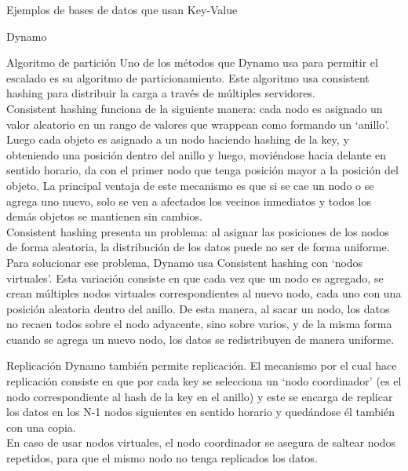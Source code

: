 \begin{section}{Ejemplos de bases de datos que usan Key-Value}
\begin{subsection}{Dynamo}
\begin{subsubsection}{Algoritmo de partición}
Uno de los métodos que Dynamo usa para permitir el escalado es su algoritmo de particionamiento. Este algoritmo usa consistent hashing para distribuir la carga a través de múltiples servidores. \\

	Consistent hashing funciona de la siguiente manera: cada nodo es asignado un valor aleatorio en un rango de valores que wrappean como formando un ‘anillo’. Luego cada objeto es asignado a un nodo haciendo hashing de la key, y obteniendo una posición dentro del anillo y luego, moviéndose hacia delante en sentido horario, da con el primer nodo que tenga posición mayor a la posición del objeto. La principal ventaja de este mecanismo es que si se cae un nodo o se agrega uno nuevo, solo se ven a afectados los vecinos inmediatos y todos los demás objetos se mantienen sin cambios.\\
	
	Consistent hashing presenta un problema: al asignar las posiciones de los nodos de forma aleatoria, la distribución de los datos puede no ser de forma uniforme. Para solucionar ese problema, Dynamo usa Consistent hashing con ‘nodos virtuales’. Esta variación consiste en que cada vez que un nodo es agregado, se crean múltiples nodos virtuales correspondientes al nuevo nodo, cada uno con una posición aleatoria dentro del anillo. De esta manera, al sacar un nodo, los datos no recaen todos sobre el nodo adyacente, sino sobre varios, y de la misma forma cuando se agrega un nuevo nodo, los datos se redistribuyen de manera uniforme.
	\\
\end{subsubsection}

\begin{subsubsection}{Replicación}
	Dynamo también permite replicación. El mecanismo por el cual hace replicación consiste en que por cada key se selecciona un ‘nodo coordinador’ (es el nodo correspondiente al hash de la key en el anillo) y este se encarga de replicar los datos en los N-1 nodos siguientes en sentido horario y quedándose él también con una copia.\\
	
En caso de usar nodos virtuales, el nodo coordinador se asegura de saltear nodos repetidos, para que el mismo nodo no tenga replicados los datos. \\

\end{subsubsection}


\end{subsection}
\end{section}
